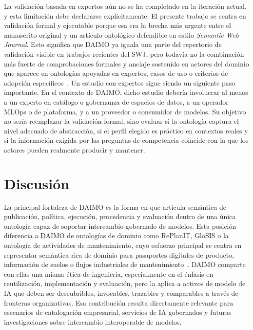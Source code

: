 \documentclass[11pt,a4paper]{article}
\begin{document}
La validación basada en expertos aún no se ha completado en la iteración actual, y esta limitación debe declararse explícitamente. El presente trabajo se centra en validación formal y ejecutable porque esa era la brecha más urgente entre el manuscrito original y un artículo ontológico defendible en estilo \emph{Semantic Web Journal}. Esto significa que DAIMO ya iguala una parte del repertorio de validación visible en trabajos recientes del SWJ, pero todavía no la combinación más fuerte de comprobaciones formales y anclaje sostenido en actores del dominio que aparece en ontologías apoyadas en expertos, casos de uso o criterios de adopción específicos~\cite{kurteva,palma,woods}. Un estudio con expertos sigue siendo un siguiente paso importante. En el contexto de DAIMO, dicho estudio debería involucrar al menos a un experto en catálogo o gobernanza de espacios de datos, a un operador MLOps o de plataforma, y a un proveedor o consumidor de modelos. Su objetivo no sería reemplazar la validación formal, sino evaluar si la ontología captura el nivel adecuado de abstracción, si el perfil elegido es práctico en contextos reales y si la información exigida por las preguntas de competencia coincide con la que los actores pueden realmente producir y mantener.

\section{Discusión}\label{sec:discussion}

La principal fortaleza de DAIMO es la forma en que articula semántica de publicación, política, ejecución, procedencia y evaluación dentro de una única ontología capaz de soportar intercambio gobernado de modelos. Esta posición diferencia a DAIMO de ontologías de dominio como RePlanIT, GloSIS o la ontología de actividades de mantenimiento, cuyo esfuerzo principal se centra en representar semántica rica de dominio para pasaportes digitales de producto, información de suelos o flujos industriales de mantenimiento~\cite{kurteva,palma,woods}. DAIMO comparte con ellas una misma ética de ingeniería, especialmente en el énfasis en reutilización, implementación y evaluación, pero la aplica a activos de modelo de IA que deben ser descubribles, invocables, trazables y comparables a través de fronteras organizativas. Esa contribución resulta directamente relevante para escenarios de catalogación empresarial, servicios de IA gobernados y futuras investigaciones sobre intercambio interoperable de modelos.
\end{document}
